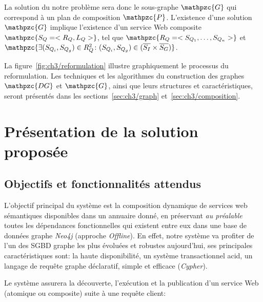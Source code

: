 La solution du notre problème sera donc le sous-graphe $\mathpzc{G}$
qui correspond à un plan de composition $\mathpzc{P}$. L'existence
d'une solution $\mathpzc{G}$ implique l'existence d'un service Web
composite $\mathpzc{S_Q= <R_Q, L_Q>}$, tel que
$\mathpzc{R_Q= <S_{Q_1}, \dots, S_{Q_n}>}$ et
$\mathpzc{\exists (S_{Q_i},S_{Q_g}) \in R_Q^2 \colon (S_{Q_i},S_{Q_g})
  \in (\overline{S_I} \times \overline{S_G})}$.\medskip

La figure~\ref{fig:ch3/reformulation} illustre graphiquement le
processus du reformulation. Les techniques et les algorithmes du
construction des graphes $\mathpzc{DG}$ et $\mathpzc{G}$, ainsi que
leurs structures et caractéristiques, seront présentés dans les
sections~\ref{sec:ch3/graph} et~\ref{sec:ch3/composition}.\medskip

\section{Présentation de la solution proposée}
\label{sec:ch3/presentation}

\subsection{Objectifs et fonctionnalités attendus}
\label{sec:ch3/presentation-goals}

L'objectif principal du système est la composition dynamique de
services web sémantiques disponibles dans un annuaire donné, en
préservant \emph{au préalable} toutes les dépendances fonctionnelles
qui existent entre eux dans une base de données graphe \emph{Neo4j}
(approche \emph{Offline}). En effet, notre système va profiter de l'un
des \acrshort{SGBD} graphe les plus évoluées et robustes aujourd'hui,
ses principales caractéristiques sont: la haute disponibilité, un
système transactionnel \acrshort{acid}, un langage de requête graphe
déclaratif, simple et efficace (\emph{Cypher}).\medskip

Le système assurera la découverte, l'exécution et la publication d'un
service Web (atomique ou composite) suite à une requête
client:\medskip

